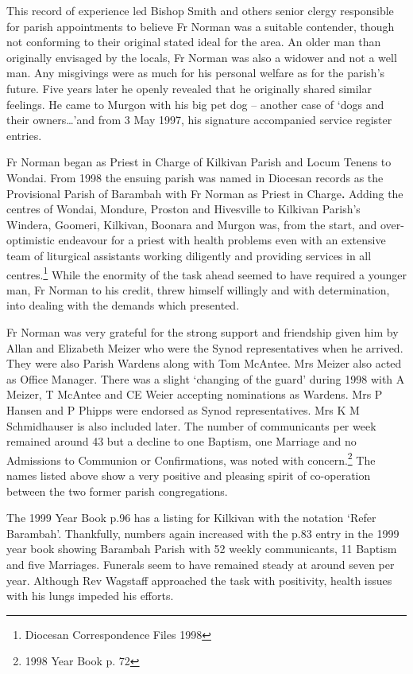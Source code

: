 This record of experience led Bishop Smith and others senior clergy responsible for parish appointments to believe Fr Norman was a suitable contender, though not conforming to their original stated ideal for the area. An older man than originally envisaged by the locals, Fr Norman was also a widower and not a well man. Any misgivings were as much for his personal welfare as for the parish's future. Five years later he openly revealed that he originally shared similar feelings. He came to Murgon with his big pet dog -- another case of `dogs and their owners\ldots'and from 3 May 1997, his signature accompanied service register entries.

Fr Norman began as Priest in Charge of Kilkivan Parish and Locum Tenens to Wondai. From 1998 the ensuing parish was named in Diocesan records as the Provisional Parish of Barambah with Fr Norman as Priest in Charge\textbf{.} Adding the centres of Wondai, Mondure, Proston and Hivesville to Kilkivan Parish's Windera, Goomeri, Kilkivan, Boonara and Murgon was, from the start, and over-optimistic endeavour for a priest with health problems even with an extensive team of liturgical assistants working diligently and providing services in all centres.\footnote{Diocesan Correspondence Files 1998} While the enormity of the task ahead seemed to have required a younger man, Fr Norman to his credit, threw himself willingly and with determination, into dealing with the demands which presented.

Fr Norman was very grateful for the strong support and friendship given him by Allan and Elizabeth Meizer who were the Synod representatives when he arrived. They were also Parish Wardens along with Tom McAntee. Mrs Meizer also acted as Office Manager. There was a slight `changing of the guard' during 1998 with A Meizer, T McAntee and CE Weier accepting nominations as Wardens. Mrs P Hansen and P Phipps were endorsed as Synod representatives. Mrs K M Schmidhauser is also included later. The number of communicants per week remained around 43 but a decline to one Baptism, one Marriage and no Admissions to Communion or Confirmations, was noted with concern.\footnote{1998 Year Book p. 72} The names listed above show a very positive and pleasing spirit of co-operation between the two former parish congregations.

The 1999 Year Book p.96 has a listing for Kilkivan with the notation `Refer Barambah'. Thankfully, numbers again increased with the p.83 entry in the 1999 year book showing Barambah Parish with 52 weekly communicants, 11 Baptism and five Marriages. Funerals seem to have remained steady at around seven per year. Although Rev Wagstaff approached the task with positivity, health issues with his lungs impeded his efforts.

